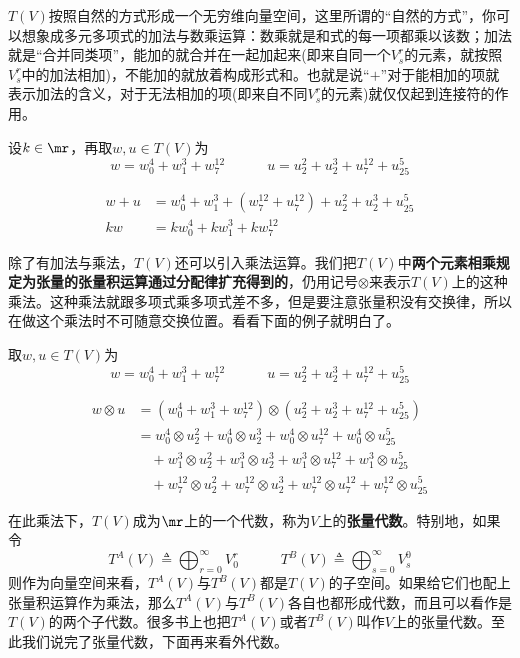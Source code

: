 $T(V)$按照自然的方式形成一个无穷维向量空间，这里所谓的“自然的方式”，你可以想象成多元多项式的加法与数乘运算：数乘就是和式的每一项都乘以该数；加法就是“合并同类项”，能加的就合并在一起加起来(即来自同一个$V^{r}_{s}$的元素，就按照$V^{r}_{s}$中的加法相加)，不能加的就放着构成形式和。也就是说“$+$”对于能相加的项就表示加法的含义，对于无法相加的项(即来自不同$V^{r}_{s}$的元素)就仅仅起到连接符的作用。

\begin{example}[$ T(V) $上的加法与数乘]
设$k\in \mr$，再取$ w,u\in T(V) $为
\[
	w=w_{0}^{4}+ w_{1}^{3}+ w^{12}_{7}\quad
	\quad\quad
	u=u_{2}^{2}+ u_{2}^{3}+ u^{12}_{7}+ u^{5}_{25}
\]
\soln

 \[
 \begin{split}
 w+u&=w_{0}^{4}+ w_{1}^{3}+ (w^{12}_{7}+ u^{12}_{7})+ u_{2}^{2}+  u_{2}^{3}+ u^{5}_{25}\\
kw&=kw_{0}^{4}+ kw_{1}^{3}+ kw^{12}_{7}
 \end{split}
 \]
\end{example}

除了有加法与乘法，$T(V)  $还可以引入乘法运算。我们把$T(V)$中\textbf{两个元素相乘规定为张量的张量积运算通过分配律扩充得到的}，仍用记号$\otimes $来表示$T(V)$上的这种乘法。这种乘法就跟多项式乘多项式差不多，但是要注意张量积没有交换律，所以在做这个乘法时不可随意交换位置。看看下面的例子就明白了。

\begin{example}[$ T(V) $上的乘法]
	取$ w,u\in T(V) $为
\[
	w=w_{0}^{4}+ w_{1}^{3}+ w^{12}_{7}\quad
	\quad\quad
	u=u_{2}^{2}+ u_{2}^{3}+ u^{12}_{7}+ u^{5}_{25}
\]
\soln

\[
\begin{split}
	w\otimes u&=\left( w_{0}^{4}+ w_{1}^{3}+ w^{12}_{7} \right)\otimes \left( u_{2}^{2}+ u_{2}^{3}+ u^{12}_{7}+ u^{5}_{25} \right)\\
	&=w_{0}^{4}\otimes u_{2}^{2}+ w_{0}^{4}\otimes u_{2}^{3}+ w_{0}^{4}\otimes u^{12}_{7}+ w_{0}^{4}\otimes u^{5}_{25}\\
	&\quad + w_{1}^{3}\otimes u_{2}^{2}+ w_{1}^{3}\otimes u_{2}^{3}+ w_{1}^{3}\otimes u^{12}_{7}+ w_{1}^{3}\otimes u^{5}_{25}\\
	&\quad + w^{12}_{7}\otimes u_{2}^{2}+ w^{12}_{7}\otimes u_{2}^{3}+ w^{12}_{7}\otimes u^{12}_{7}+ w^{12}_{7}\otimes u^{5}_{25}
\end{split}
\]
\end{example}

在此乘法下，$T(V)$成为$\mr$上的一个代数，称为$V$上的\textbf{张量代数}。特别地，如果令
\[
T^{A}(V)\triangleq \bigoplus_{r= 0}^{\infty} V^{r}_{0} \quad\quad\quad T^{B}(V)\triangleq \bigoplus_{s=0}^{\infty} V^{0}_{s}
\]
则作为向量空间来看，$T^{A}(V)$与$T^{B}(V)$都是$T(V)$的子空间。如果给它们也配上张量积运算作为乘法，那么$T^{A}(V)$与$T^{B}(V)$各自也都形成代数，而且可以看作是$T(V)$的两个子代数。很多书上也把$T^{A}(V)$或者$T^{B}(V)$叫作$V$上的张量代数。至此我们说完了张量代数，下面再来看外代数。

